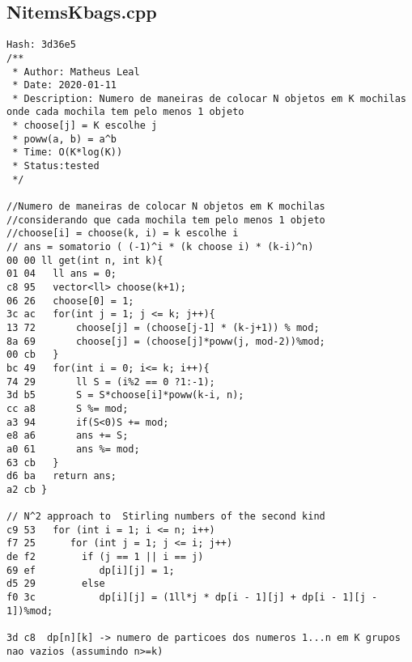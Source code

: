 \documentclass[11pt, a4paper, twoside]{article}
\begin{document}
\subsection{NitemsKbags.cpp}
\begin{lstlisting}
Hash: 3d36e5
/**
 * Author: Matheus Leal
 * Date: 2020-01-11
 * Description: Numero de maneiras de colocar N objetos em K mochilas onde cada mochila tem pelo menos 1 objeto
 * choose[j] = K escolhe j
 * poww(a, b) = a^b
 * Time: O(K*log(K))
 * Status:tested
 */
 
//Numero de maneiras de colocar N objetos em K mochilas
//considerando que cada mochila tem pelo menos 1 objeto
//choose[i] = choose(k, i) = k escolhe i
// ans = somatorio ( (-1)^i * (k choose i) * (k-i)^n)
00 00 ll get(int n, int k){
01 04 	ll ans = 0;
c8 95 	vector<ll> choose(k+1);
06 26 	choose[0] = 1;
3c ac 	for(int j = 1; j <= k; j++){
13 72 		choose[j] = (choose[j-1] * (k-j+1)) % mod;
8a 69 		choose[j] = (choose[j]*poww(j, mod-2))%mod;
00 cb 	}
bc 49 	for(int i = 0; i<= k; i++){
74 29 		ll S = (i%2 == 0 ?1:-1);
3d b5 		S = S*choose[i]*poww(k-i, n);
cc a8 		S %= mod;
a3 94 		if(S<0)S += mod;
e8 a6 		ans += S;
a0 61 		ans %= mod;
63 cb 	}
d6 ba 	return ans;
a2 cb }

// N^2 approach to  Stirling numbers of the second kind
c9 53   for (int i = 1; i <= n; i++) 
f7 25      for (int j = 1; j <= i; j++) 
de f2        if (j == 1 || i == j) 
69 ef           dp[i][j] = 1; 
d5 29        else
f0 3c           dp[i][j] = (1ll*j * dp[i - 1][j] + dp[i - 1][j - 1])%mod; 
  
3d c8  dp[n][k] -> numero de particoes dos numeros 1...n em K grupos nao vazios (assumindo n>=k)  
\end{lstlisting}
\end{document}
